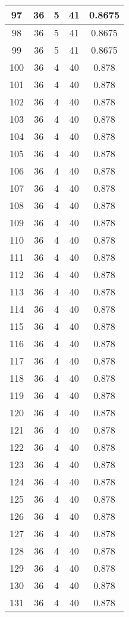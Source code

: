 \documentclass[letterpaper, 12pt]{article}
\begin{document}
\begin{longtable}{|c|c|c|c|c|}
\hline
97 & 36 & 5 & 41 & 0.8675 \\
\hline
98 & 36 & 5 & 41 & 0.8675 \\
\hline
99 & 36 & 5 & 41 & 0.8675 \\
\hline
100 & 36 & 4 & 40 & 0.878 \\
\hline
101 & 36 & 4 & 40 & 0.878 \\
\hline
102 & 36 & 4 & 40 & 0.878 \\
\hline
103 & 36 & 4 & 40 & 0.878 \\
\hline
104 & 36 & 4 & 40 & 0.878 \\
\hline
105 & 36 & 4 & 40 & 0.878 \\
\hline
106 & 36 & 4 & 40 & 0.878 \\
\hline
107 & 36 & 4 & 40 & 0.878 \\
\hline
108 & 36 & 4 & 40 & 0.878 \\
\hline
109 & 36 & 4 & 40 & 0.878 \\
\hline
110 & 36 & 4 & 40 & 0.878 \\
\hline
111 & 36 & 4 & 40 & 0.878 \\
\hline
112 & 36 & 4 & 40 & 0.878 \\
\hline
113 & 36 & 4 & 40 & 0.878 \\
\hline
114 & 36 & 4 & 40 & 0.878 \\
\hline
115 & 36 & 4 & 40 & 0.878 \\
\hline
116 & 36 & 4 & 40 & 0.878 \\
\hline
117 & 36 & 4 & 40 & 0.878 \\
\hline
118 & 36 & 4 & 40 & 0.878 \\
\hline
119 & 36 & 4 & 40 & 0.878 \\
\hline
120 & 36 & 4 & 40 & 0.878 \\
\hline
121 & 36 & 4 & 40 & 0.878 \\
\hline
122 & 36 & 4 & 40 & 0.878 \\
\hline
123 & 36 & 4 & 40 & 0.878 \\
\hline
124 & 36 & 4 & 40 & 0.878 \\
\hline
125 & 36 & 4 & 40 & 0.878 \\
\hline
126 & 36 & 4 & 40 & 0.878 \\
\hline
127 & 36 & 4 & 40 & 0.878 \\
\hline
128 & 36 & 4 & 40 & 0.878 \\
\hline
129 & 36 & 4 & 40 & 0.878 \\
\hline
130 & 36 & 4 & 40 & 0.878 \\
\hline
131 & 36 & 4 & 40 & 0.878 \\

\end{longtable}
\end{document}
